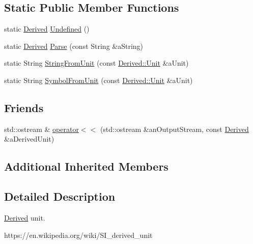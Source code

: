 \subsection*{Static Public Member Functions}
\begin{DoxyCompactItemize}
\item 
static \hyperlink{classlibrary_1_1physics_1_1units_1_1_derived}{Derived} \hyperlink{classlibrary_1_1physics_1_1units_1_1_derived_a6b6d1cdd9a736856d213504e2b04fe4c}{Undefined} ()
\item 
static \hyperlink{classlibrary_1_1physics_1_1units_1_1_derived}{Derived} \hyperlink{classlibrary_1_1physics_1_1units_1_1_derived_a45b4ceae1f94e6877d15e67bf97572ee}{Parse} (const String \&a\+String)
\item 
static String \hyperlink{classlibrary_1_1physics_1_1units_1_1_derived_aca817ec7752af10f66c14f94467cf546}{String\+From\+Unit} (const \hyperlink{classlibrary_1_1physics_1_1units_1_1_derived_1_1_unit}{Derived\+::\+Unit} \&a\+Unit)
\item 
static String \hyperlink{classlibrary_1_1physics_1_1units_1_1_derived_a4c11c10b784fbb12cdae01125091a386}{Symbol\+From\+Unit} (const \hyperlink{classlibrary_1_1physics_1_1units_1_1_derived_1_1_unit}{Derived\+::\+Unit} \&a\+Unit)
\end{DoxyCompactItemize}
\subsection*{Friends}
\begin{DoxyCompactItemize}
\item 
std\+::ostream \& \hyperlink{classlibrary_1_1physics_1_1units_1_1_derived_a033deb6664987f4b2f86f5abeb18da81}{operator$<$$<$} (std\+::ostream \&an\+Output\+Stream, const \hyperlink{classlibrary_1_1physics_1_1units_1_1_derived}{Derived} \&a\+Derived\+Unit)
\end{DoxyCompactItemize}
\subsection*{Additional Inherited Members}


\subsection{Detailed Description}
\hyperlink{classlibrary_1_1physics_1_1units_1_1_derived}{Derived} unit. 

https\+://en.wikipedia.\+org/wiki/\+S\+I\+\_\+derived\+\_\+unit 

